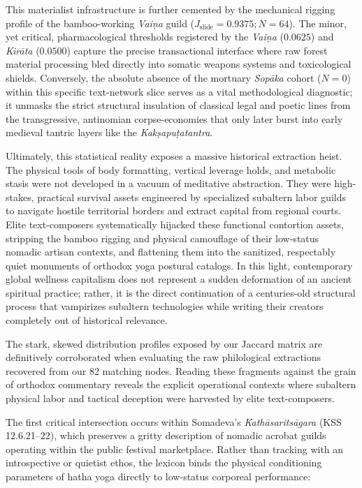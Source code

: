\documentclass[11pt,twoside,letterpaper]{article}
\begin{document}
This materialist infrastructure is further cemented by the mechanical rigging profile of the bamboo-working \textit{Vaiṇa} guild ($J_{\text{slide}} = 0.9375; N = 64$). The minor, yet critical, pharmacological thresholds registered by the \textit{Vaiṇa} ($0.0625$) and \textit{Kirāta} ($0.0500$) capture the precise transactional interface where raw forest material processing bled directly into somatic weapons systems and toxicological shields. Conversely, the absolute absence of the mortuary \textit{Sopāka} cohort ($N = 0$) within this specific text-network slice serves as a vital methodological diagnostic; it unmasks the strict structural insulation of classical legal and poetic lines from the transgressive, antinomian corpse-economies that only later burst into early medieval tantric layers like the \textit{Kakṣapuṭatantra}.

Ultimately, this statistical reality exposes a massive historical extraction heist. The physical tools of body formatting, vertical leverage holds, and metabolic stasis were not developed in a vacuum of meditative abstraction. They were high-stakes, practical survival assets engineered by specialized subaltern labor guilds to navigate hostile territorial borders and extract capital from regional courts. Elite text-composers systematically hijacked these functional contortion assets, stripping the bamboo rigging and physical camouflage of their low-status nomadic artisan contexts, and flattening them into the sanitized, respectably quiet monuments of orthodox yoga postural catalogs. In this light, contemporary global wellness capitalism does not represent a sudden deformation of an ancient spiritual practice; rather, it is the direct continuation of a centuries-old structural process that vampirizes subaltern technologies while writing their creators completely out of historical relevance.

The stark, skewed distribution profiles exposed by our Jaccard matrix are definitively corroborated when evaluating the raw philological extractions recovered from our 82 matching nodes. Reading these fragments against the grain of orthodox commentary reveals the explicit operational contexts where subaltern physical labor and tactical deception were harvested by elite text-composers. 

The first critical intersection occurs within Somadeva's \textit{Kathāsaritsāgara} (KSS 12.6.21–22), which preserves a gritty description of nomadic acrobat guilds operating within the public festival marketplace. Rather than tracking with an introspective or quietist ethos, the lexicon binds the physical conditioning parameters of hatha yoga directly to low-status corporeal performance:
\end{document}
